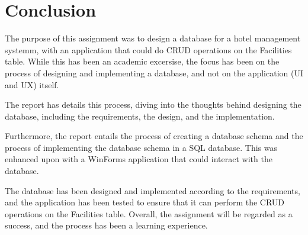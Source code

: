 \chapter{Conclusion}
\label{chapter:conclusion}

The purpose of this assignment was to design a database for a hotel management systemm, with an application that could do CRUD operations on the Facilities table. 
While this has been an academic excersise, the focus has been on the process of designing and implementing a database, and not on the application (UI and UX) itself.

The report has details this process, diving into the thoughts behind designing the database, including the requirements, the design, and the implementation. 

Furthermore, the report entails the process of creating a database schema and the process of implementing the database schema in a SQL database. 
This was enhanced upon with a WinForms application that could interact with the database.

The database has been designed and implemented according to the requirements, and the application has been tested to ensure that it can perform the CRUD operations on the Facilities table.
Overall, the assignment will be regarded as a success, and the process has been a learning experience.